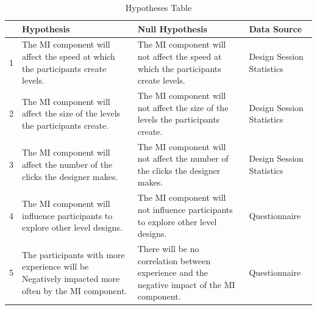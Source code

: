 \documentclass[journal]{IEEEtran}
\begin{document}
\begin{table}[h]
		\centering
		\caption{Hypotheses Table}
		\label{hyp}
		\def\arraystretch{1.5}
		\begin{tabular}{|c|p{7cm}|p{7cm}|p{1.75cm}|}
			\hline
			& \textbf{Hypothesis}& \textbf{Null Hypothesis} & \textbf{Data Source}\\\hline
			1 & The MI component will affect the speed at which the participants create levels.
			& The MI component will not affect the speed at which the participants create levels.
			& Design Session Statistics\\ \hline
			
			2 & The MI component will affect the size of the levels the participants create.
			& The MI component will not affect the size of the levels the participants create.
			& Design Session Statistics\\ \hline

			3 & The MI component will affect the number of the clicks the designer makes.
			& The MI component will not affect the number of the clicks the designer makes.
			& Design Session Statistics\\ \hline

			4 & The MI component will influence participants to explore other level designs.
			& The MI component will not influence participants to explore other level designs.
			& Questionnaire\\ \hline

		      5 & The participants with more experience will be Negatively impacted more often by the MI component.
			&  There will be no correlation between experience and the negative impact of the MI component.
			& Questionnaire\\ \hline
			
		\end{tabular}
\end{table}
\end{document}
